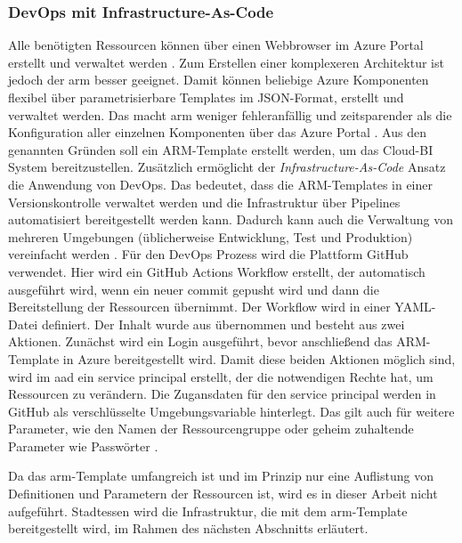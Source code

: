 \subsubsection{DevOps mit Infrastructure-As-Code} \label{subsec:infra:konfig:policy}
Alle benötigten Ressourcen können über einen Webbrowser im Azure Portal erstellt und verwaltet werden \cite{chilberto_building_2020}. Zum Erstellen einer komplexeren Architektur ist jedoch der \ac{arm} besser geeignet. Damit können beliebige Azure Komponenten flexibel über parametrisierbare Templates im JSON-Format, erstellt und verwaltet werden. Das macht \ac{arm} weniger fehleranfällig und zeitsparender als die Konfiguration aller einzelnen Komponenten über das Azure Portal \cite{monadjemi_azure-administration_2017}. Aus den genannten Gründen soll ein ARM-Template erstellt werden, um das Cloud-BI System bereitzustellen. Zusätzlich ermöglicht der \textit{Infrastructure-As-Code} Ansatz die Anwendung von DevOps. Das bedeutet, dass die ARM-Templates in einer Versionskontrolle verwaltet werden und die Infrastruktur über Pipelines automatisiert bereitgestellt werden kann. Dadurch kann auch die Verwaltung von mehreren Umgebungen (üblicherweise Entwicklung, Test und Produktion) vereinfacht werden \cite{riscutia_data_2021}. Für den DevOps Prozess wird die Plattform GitHub verwendet. Hier wird ein GitHub Actions Workflow erstellt, der automatisch ausgeführt wird, wenn ein neuer commit gepusht wird und dann die Bereitstellung der Ressourcen übernimmt. Der Workflow wird in einer YAML-Datei definiert. Der Inhalt wurde aus  übernommen und besteht aus zwei Aktionen. Zunächst wird ein Login ausgeführt, bevor anschließend das ARM-Template in Azure bereitgestellt wird. Damit diese beiden Aktionen möglich sind, wird im \ac{aad} ein service principal erstellt, der die notwendigen Rechte hat, um Ressourcen zu verändern. Die Zugansdaten für den service principal werden in GitHub als verschlüsselte Umgebungsvariable hinterlegt. Das gilt auch für weitere Parameter, wie den Namen der Ressourcengruppe oder geheim zuhaltende Parameter wie Passwörter \cite[vgl.][]{rendon_deploy_2022}.

Da das \ac{arm}-Template umfangreich ist und im Prinzip nur eine Auflistung von Definitionen und Parametern der Ressourcen ist, wird es in dieser Arbeit nicht aufgeführt. Stadtessen wird die Infrastruktur, die mit dem \ac{arm}-Template bereitgestellt wird, im Rahmen des nächsten Abschnitts erläutert.

